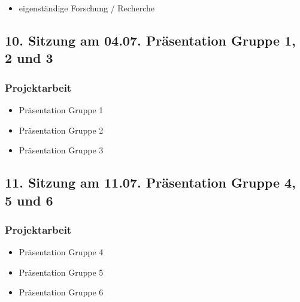 \documentclass[
  ngerman,
]{article}
\providecommand{\tightlist}{%
  \setlength{\itemsep}{0pt}\setlength{\parskip}{0pt}}
\begin{document}
\begin{itemize}
\tightlist
\item
  eigenständige Forschung / Recherche
\end{itemize}

\hypertarget{sitzung-am-04.07.-pruxe4sentation-gruppe-1-2-und-3}{%
\subsection*{10. Sitzung am 04.07. \textbar{} Präsentation Gruppe 1, 2 und 3}\label{sitzung-am-04.07.-pruxe4sentation-gruppe-1-2-und-3}}

\hypertarget{projektarbeit-7}{%
\subsubsection*{Projektarbeit}\label{projektarbeit-7}}

\begin{itemize}
\tightlist
\item
  Präsentation Gruppe 1
\item
  Präsentation Gruppe 2
\item
  Präsentation Gruppe 3
\end{itemize}

\hypertarget{sitzung-am-11.07.-pruxe4sentation-gruppe-4-5-und-6}{%
\subsection*{11. Sitzung am 11.07. \textbar{} Präsentation Gruppe 4, 5 und 6}\label{sitzung-am-11.07.-pruxe4sentation-gruppe-4-5-und-6}}

\hypertarget{projektarbeit-8}{%
\subsubsection*{Projektarbeit}\label{projektarbeit-8}}

\begin{itemize}
\tightlist
\item
  Präsentation Gruppe 4
\item
  Präsentation Gruppe 5
\item
  Präsentation Gruppe 6
\end{itemize}
\end{document}
